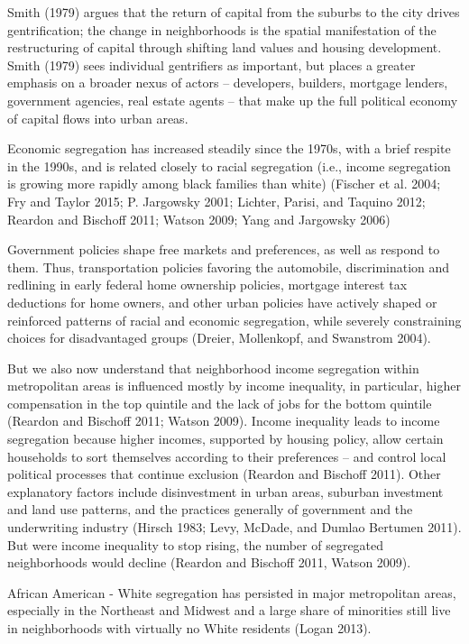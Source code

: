 \documentclass[]{article}
\begin{document}
Smith (1979) argues that the return of capital from the suburbs to the
city drives gentrification; the change in neighborhoods is the spatial
manifestation of the restructuring of capital through shifting land
values and housing development. Smith (1979) sees individual gentrifiers
as important, but places a greater emphasis on a broader nexus of actors
-- developers, builders, mortgage lenders, government agencies, real
estate agents -- that make up the full political economy of capital
flows into urban areas.

Economic segregation has increased steadily since the 1970s, with a
brief respite in the 1990s, and is related closely to racial segregation
(i.e., income segregation is growing more rapidly among black families
than white) (Fischer et al. 2004; Fry and Taylor 2015; P. Jargowsky
2001; Lichter, Parisi, and Taquino 2012; Reardon and Bischoff 2011;
Watson 2009; Yang and Jargowsky 2006)

Government policies shape free markets and preferences, as well as
respond to them. Thus, transportation policies favoring the automobile,
discrimination and redlining in early federal home ownership policies,
mortgage interest tax deductions for home owners, and other urban
policies have actively shaped or reinforced patterns of racial and
economic segregation, while severely constraining choices for
disadvantaged groups (Dreier, Mollenkopf, and Swanstrom 2004).

But we also now understand that neighborhood income segregation within
metropolitan areas is influenced mostly by income inequality, in
particular, higher compensation in the top quintile and the lack of jobs
for the bottom quintile (Reardon and Bischoff 2011; Watson 2009). Income
inequality leads to income segregation because higher incomes, supported
by housing policy, allow certain households to sort themselves according
to their preferences -- and control local political processes that
continue exclusion (Reardon and Bischoff 2011). Other explanatory
factors include disinvestment in urban areas, suburban investment and
land use patterns, and the practices generally of government and the
underwriting industry (Hirsch 1983; Levy, McDade, and Dumlao Bertumen
2011). But were income inequality to stop rising, the number of
segregated neighborhoods would decline (Reardon and Bischoff 2011,
Watson 2009).

African American - White segregation has persisted in major metropolitan
areas, especially in the Northeast and Midwest and a large share of
minorities still live in neighborhoods with virtually no White residents
(Logan 2013).
\end{document}

